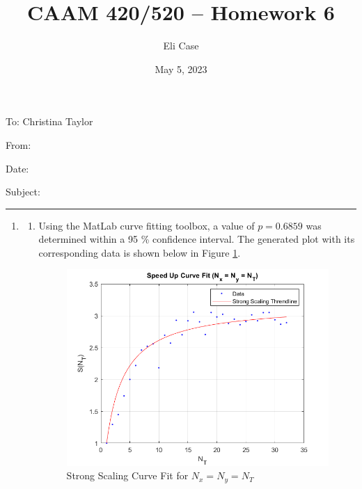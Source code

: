 \documentclass[11pt]{article}
\author{Eli Case}
\title{CAAM 420/520 -- Homework 6}
\date{May 5, 2023}
\begin{document}
\flushleft
\thispagestyle{plain}
To: Christina Taylor

From: \@author

Date: \@date

Subject: \@title

\makeatother
\medskip
\hrule
\medskip

\begin{enumerate}[leftmargin=0.9in]

   \item %
   
   \begin{enumerate}[leftmargin=0.3in]
       \item Using the MatLab curve fitting toolbox, a value of $p = 0.6859$ was determined within a 95 \% confidence interval. The generated plot with its corresponding data is shown below in Figure \ref{fig:1}.
           \begin{figure}[H]
          \centering
          \includegraphics[width=12cm]{./figures/problem1a.png}
          \caption{Strong Scaling Curve Fit for $N_x = N_y = N_T$}
          \label{fig:1}
          \end{figure}
 

\end{enumerate}
\end{enumerate}
\end{document}
